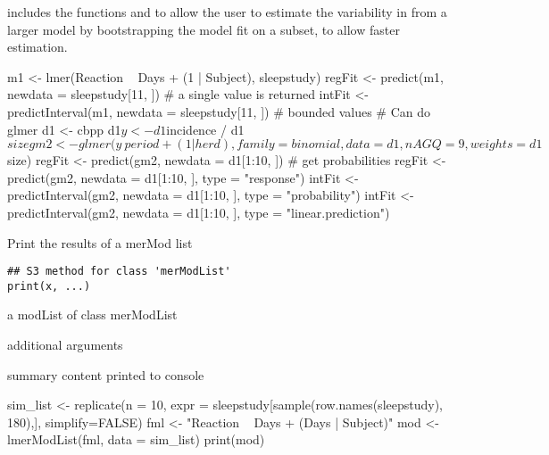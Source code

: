 \documentclass[letterpaper]{book}
\begin{document}
%
\begin{Note}\relax
{} includes the functions  and 
to allow the user to estimate the variability in  from a larger
model by bootstrapping the model fit on a subset, to allow faster estimation.
\end{Note}
%
\begin{Examples}
\begin{ExampleCode}
m1 <- lmer(Reaction ~ Days + (1 | Subject), sleepstudy)
regFit <- predict(m1, newdata = sleepstudy[11, ]) # a single value is returned
intFit <- predictInterval(m1, newdata = sleepstudy[11, ]) # bounded values
# Can do glmer
d1 <- cbpp
d1$y <- d1$incidence / d1$size
 gm2 <- glmer(y ~ period + (1 | herd), family = binomial, data = d1,
               nAGQ = 9, weights = d1$size)
 regFit <- predict(gm2, newdata = d1[1:10, ])
 # get probabilities
 regFit <- predict(gm2, newdata = d1[1:10, ], type = "response")
 intFit <- predictInterval(gm2, newdata = d1[1:10, ], type = "probability")
 intFit <- predictInterval(gm2, newdata = d1[1:10, ], type = "linear.prediction")
\end{ExampleCode}
\end{Examples}
%
\begin{Description}\relax
Print the results of a merMod list
\end{Description}
%
\begin{Usage}
\begin{verbatim}
## S3 method for class 'merModList'
print(x, ...)
\end{verbatim}
\end{Usage}
%
\begin{Arguments}
\begin{ldescription}
\item[\code{x}] a modList of class merModList

\item[\code{...}] additional arguments
\end{ldescription}
\end{Arguments}
%
\begin{Value}
summary content printed to console
\end{Value}
%
\begin{Examples}
\begin{ExampleCode}
sim_list <- replicate(n = 10,
        expr = sleepstudy[sample(row.names(sleepstudy), 180),],
        simplify=FALSE)
fml <- "Reaction ~ Days + (Days | Subject)"
mod <- lmerModList(fml, data = sim_list)
print(mod)
\end{ExampleCode}
\end{Examples}
\end{document}
